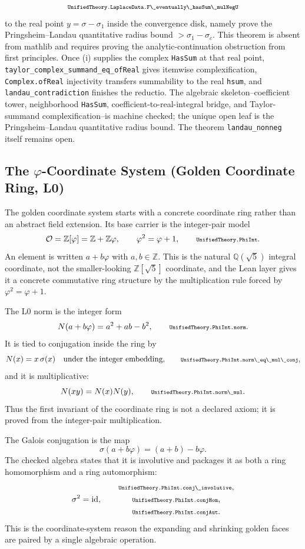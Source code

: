 \documentclass[11pt]{article}
\newcommand{\lean}[1]{\relax\ifmmode\hbox{\scriptsize\ttfamily\detokenize{#1}}\else{\small\texttt{\detokenize{#1}}}\fi}
\begin{document}
$$
  \lean{UnifiedTheory.LaplaceData.F\_eventually\_hasSum\_mulNegU}
$$
to the real point $y=\sigma-\sigma_1$ inside the convergence disk, namely prove the Pringsheim--Landau quantitative radius bound $>\sigma_1-\sigma_c$.  This theorem is absent from mathlib and requires proving the analytic-continuation obstruction from first principles.  Once (i) supplies the complex \texttt{HasSum} at that real point, \texttt{taylor\_complex\_summand\_eq\_ofReal} gives itemwise complexification, \texttt{Complex.ofReal} injectivity transfers summability to the real \texttt{hsum}, and \texttt{landau\_contradiction} finishes the reductio.  The algebraic skeleton--coefficient tower, neighborhood \texttt{HasSum}, coefficient-to-real-integral bridge, and Taylor-summand complexification--is machine checked; the unique open leaf is the Pringsheim--Landau quantitative radius bound.  The theorem \texttt{landau\_nonneg} itself remains open.

\subsection{The \texorpdfstring{$\varphi$}{phi}-Coordinate System (Golden Coordinate Ring, L0)}

The golden coordinate system starts with a concrete coordinate ring rather than an abstract field extension.  Its base carrier is the integer-pair model
$$
  \mathcal O=\mathbb Z[\varphi]=\mathbb Z+\mathbb Z\varphi,
  \qquad
  \varphi^2=\varphi+1,
  \qquad
  \lean{UnifiedTheory.PhiInt}.
$$
An element is written $a+b\varphi$ with $a,b\in\mathbb Z$.  This is the natural $\mathbb Q(\sqrt5)$ integral coordinate, not the smaller-looking $\mathbb Z[\sqrt5]$ coordinate, and the Lean layer gives it a concrete commutative ring structure by the multiplication rule forced by $\varphi^2=\varphi+1$.

The L0 norm is the integer form
$$
  N(a+b\varphi)=a^2+ab-b^2,
  \qquad
  \lean{UnifiedTheory.PhiInt.norm}.
$$
It is tied to conjugation inside the ring by
$$
  N(x)=x\,\sigma(x)
  \quad\hbox{under the integer embedding,}
  \qquad
  \lean{UnifiedTheory.PhiInt.norm\_eq\_mul\_conj},
$$
and it is multiplicative:
$$
  N(xy)=N(x)N(y),
  \qquad
  \lean{UnifiedTheory.PhiInt.norm\_mul}.
$$
Thus the first invariant of the coordinate ring is not a declared axiom; it is proved from the integer-pair multiplication.

The Galois conjugation is the map
$$
  \sigma(a+b\varphi)=(a+b)-b\varphi.
$$
The checked algebra states that it is involutive and packages it as both a ring homomorphism and a ring automorphism:
$$
  \sigma^2=\operatorname{id},
  \qquad
  \begin{gathered}
  \lean{UnifiedTheory.PhiInt.conj\_involutive},\\
  \lean{UnifiedTheory.PhiInt.conjHom},\\
  \lean{UnifiedTheory.PhiInt.conjAut}.
  \end{gathered}
$$
This is the coordinate-system reason the expanding and shrinking golden faces are paired by a single algebraic operation.
\end{document}
